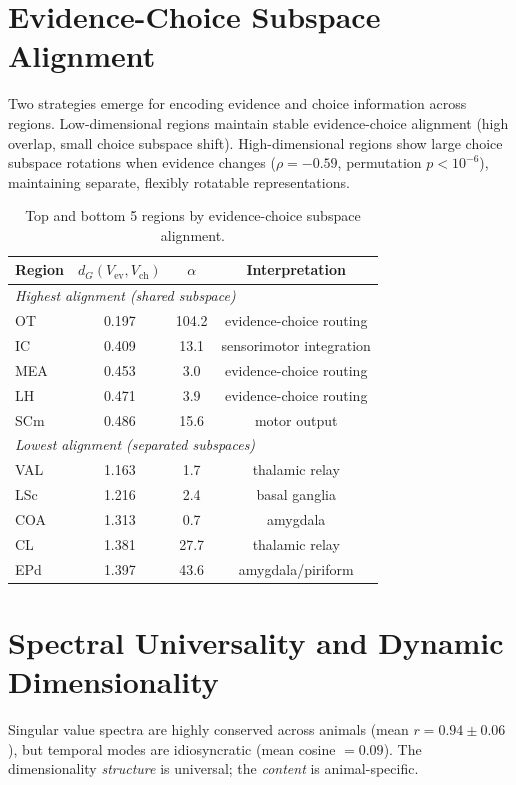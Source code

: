 \documentclass{article}
\begin{document}
\section{Evidence-Choice Subspace Alignment}
\label{app:alignment}

Two strategies emerge for encoding evidence and choice information across regions. Low-dimensional regions maintain stable evidence-choice alignment (high overlap, small choice subspace shift). High-dimensional regions show large choice subspace rotations when evidence changes ($\rho = -0.59$, permutation $p < 10^{-6}$), maintaining separate, flexibly rotatable representations.

\begin{table}[h]
\centering
\small
\caption{Top and bottom 5 regions by evidence-choice subspace alignment.}
\label{tab:routing}
\begin{tabular}{@{}lccc@{}}
\toprule
\textbf{Region} & \textbf{$d_G(V_{\text{ev}}, V_{\text{ch}})$} & \textbf{$\alpha$} & \textbf{Interpretation} \\
\midrule
\multicolumn{4}{l}{\emph{Highest alignment (shared subspace)}} \\
OT & 0.197 & 104.2 & evidence-choice routing \\
IC & 0.409 & 13.1 & sensorimotor integration \\
MEA & 0.453 & 3.0 & evidence-choice routing \\
LH & 0.471 & 3.9 & evidence-choice routing \\
SCm & 0.486 & 15.6 & motor output \\
\midrule
\multicolumn{4}{l}{\emph{Lowest alignment (separated subspaces)}} \\
VAL & 1.163 & 1.7 & thalamic relay \\
LSc & 1.216 & 2.4 & basal ganglia \\
COA & 1.313 & 0.7 & amygdala \\
CL & 1.381 & 27.7 & thalamic relay \\
EPd & 1.397 & 43.6 & amygdala/piriform \\
\bottomrule
\end{tabular}
\end{table}


\section{Spectral Universality and Dynamic Dimensionality}
\label{app:spectral}

Singular value spectra are highly conserved across animals (mean $r = 0.94 \pm 0.06$), but temporal modes are idiosyncratic (mean cosine $= 0.09$). The dimensionality \emph{structure} is universal; the \emph{content} is animal-specific.
\end{document}
